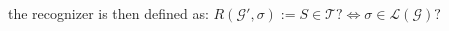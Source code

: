 \documentclass[portrait,a0b,final,a4resizeable]{a0poster}
\def\jointspacing{\vspace{0.3in}}
\begin{document}
\begin{poster}
\begin{multicols}{2}
{      \vspace{1cm}\null\hspace*{3cm}\begin{minipage}[c]{0.90\columnwidth}
        the recognizer is then defined as: $R(\mathcal{G}', \sigma) := S \in \mathcal{T}? \Longleftrightarrow \sigma \in \mathcal{L}(\mathcal{G})?$
      \end{minipage}
      }

      \jointspacing



\end{multicols}
\end{poster}
\end{document}
